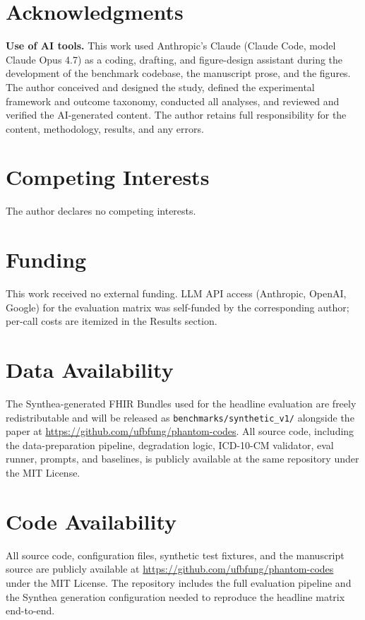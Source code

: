 \documentclass[journal]{IEEEtran}
\begin{document}







\section*{Acknowledgments}
\textbf{Use of AI tools.} This work used Anthropic's Claude (Claude
Code, model Claude Opus 4.7) as a coding, drafting, and
figure-design assistant during the development of the benchmark
codebase, the manuscript prose, and the figures. The author
conceived and designed the study, defined the experimental framework
and outcome taxonomy, conducted all analyses, and reviewed and
verified the AI-generated content. The author retains full
responsibility for the content, methodology, results, and any
errors.

\section*{Competing Interests}
The author declares no competing interests.

\section*{Funding}
This work received no external funding. LLM API access (Anthropic,
OpenAI, Google) for the evaluation matrix was self-funded by the
corresponding author; per-call costs are itemized in the Results
section.

\section*{Data Availability}
The Synthea-generated FHIR Bundles used for the headline evaluation
are freely redistributable and will be released as
\texttt{benchmarks/synthetic\_v1/} alongside the paper at
\url{https://github.com/ufbfung/phantom-codes}. All source code,
including the data-preparation pipeline, degradation logic,
ICD-10-CM validator, eval runner, prompts, and baselines, is
publicly available at the same repository under the MIT License.

\section*{Code Availability}
All source code, configuration files, synthetic test fixtures, and
the manuscript source are publicly available at
\url{https://github.com/ufbfung/phantom-codes} under the MIT
License. The repository includes the full evaluation pipeline and
the Synthea generation configuration needed to reproduce the
headline matrix end-to-end.
\end{document}
